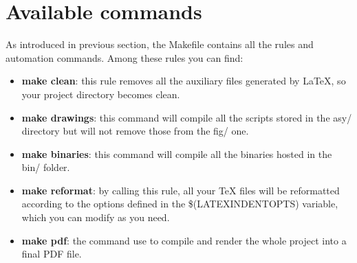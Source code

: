 \section{Available commands}

As introduced in previous section, the Makefile contains all the rules and
automation commands. Among these rules you can find:

\begin{itemize}
  \item \textbf{make clean}: this rule removes all the auxiliary files generated
	  by \LaTeX, so your project directory becomes clean.
  \item \textbf{make drawings}: this command will compile all the scripts stored
	  in the asy/ directory but will not remove those from the fig/ one.
  \item \textbf{make binaries}: this command will compile all the binaries
	  hosted in the bin/ folder.
  \item \textbf{make reformat}: by calling this rule, all your TeX files will be
	  reformatted according to the options defined in the
	  \$(LATEXINDENTOPTS) variable, which you can modify as you need.
  \item \textbf{make pdf}: the command use to compile and render the whole
	  project into a final PDF file.
\end{itemize}
